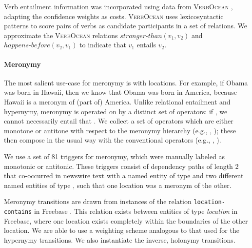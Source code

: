 Verb entailment information was incorporated using data from \textsc{VerbOcean}
 \cite{key:2004chklovski-verbocean}, adapting the confidence weights as costs.
\textsc{VerbOcean} uses lexicosyntactic patterns to score pairs of verbs as candidate participants in a set of relations.
We approximate the \textsc{VerbOcean} relations $\mathit{stronger\text{-}than}(v_1,v_2)$ and $\mathit{happens\text{-}before}(v_2,v_1)$ to indicate that $v_1$ entails $v_2$.

\paragraph{Meronymy}
The most salient use-case for meronymy is with locations.
For example, if Obama was born in Hawaii, then we know that Obama was born in
  America, because Hawaii is a meronym of (part of) America.
Unlike relational entailment and hypernymy, meronymy is operated on by a
  distinct set of operators:
  if , we cannot necessarily entail that .
We collect a set of operators which are either monotone or antitone with respect
  to the meronymy hierarchy (e.g., , ); 
  these then compose in the usual way with the conventional 
  operators (e.g., , ).

We use a set of 81 triggers for meronymy, which were manually labeled as monotonic or antitonic. These triggers consist of dependency paths of length 2 that co-occurred in newswire text with a named entity of type  and two different named entities of type , such that one location was a meronym of the other.

Meronymy transitions are drawn from instances of the relation \texttt{location-contains} in Freebase \cite{key:2008bollacker-freebase}.
This relation exists between entities of type \textit{location} in Freebase, where one location exists completely within the boundaries of the other location.
We are able to use a weighting scheme analogous to that used for the hypernymy transitions.
We also instantiate the inverse, holonymy transitions.


